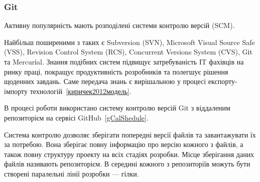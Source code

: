 \subsubsection{Git}

Активну популярність мають розподілені системи контролю версій (SCM).

Найбільш поширеними з таких є Subversion (SVN), Microsoft Visual Source Safe (VSS), Revision Control System (RCS), Concurrent Versions System (CVS), Gіt та Mercurіal. Знання подібних систем підвищує затребуваність ІT фахівців на ринку праці, покращує продуктивність розробників та полегшує рішення щоденних завдань. Саме передача знань є вирішальною у процесі експорту-імпорту технологій~\ref{киричек2012модель}.

В процесі роботи використано систему контролю версій Git з віддаленим репозиторієм на сервісі GitHub~\ref{gCalShedule}.

Система контролю дозволяє зберігати попередні версії файлів та завантажувати їх за потребою. Вона зберігає повну інформацію про версію кожного з файлів, а також повну структуру проекту на всіх стадіях розробки. Місце зберігання даних файлів називають репозиторієм. В середині кожного з репозиторіїв можуть бути створені паралельні лінії розробки — гілки.

